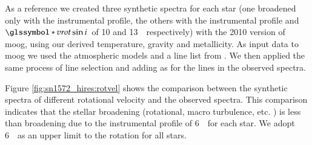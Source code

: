  As a reference we created three synthetic spectra for each star (one broadened only with the instrumental profile, the others with the instrumental profile and $\vrot\sin{i}$\ of 10 and 13~\kms\ respectively) with the 2010 version of \gls{moog}, using our derived temperature, gravity and metallicity.  As input data to \gls{moog} we used the \citet{2004astro.ph..5087C} atmospheric models and a line list from \citet{1995KurCD..23.....K}. We then applied the same process of line selection and adding as for the lines in the observed spectra. 
 
Figure \ref{fig:sn1572_hires:rotvel} shows the comparison between the synthetic spectra of different rotational velocity and the observed spectra. This comparison indicates that the stellar broadening (rotational, macro turbulence, etc. ) is less than broadening due to the instrumental profile of 6~\kms\ for each star. We adopt 6~\kms\ as an upper limit to the rotation for all stars.



